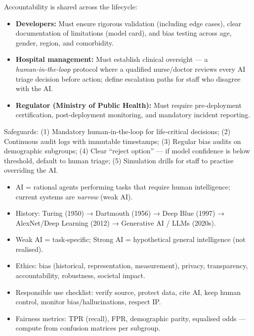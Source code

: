 \documentclass[11pt]{article}
\begin{document}
\begin{corrige}[Exercise 1]
Accountability is shared across the lifecycle:
\begin{itemize}
\item \textbf{Developers:} Must ensure rigorous validation (including edge cases), clear documentation of limitations (model card), and bias testing across age, gender, region, and comorbidity.
\item \textbf{Hospital management:} Must establish clinical oversight — a \emph{human‑in‑the‑loop} protocol where a qualified nurse/doctor reviews every AI triage decision before action; define escalation paths for staff who disagree with the AI.
\item \textbf{Regulator (Ministry of Public Health):} Must require pre‑deployment certification, post‑deployment monitoring, and mandatory incident reporting.
\end{itemize}
Safeguards: (1) Mandatory human‑in‑the‑loop for life‑critical decisions; (2) Continuous audit logs with immutable timestamps; (3) Regular bias audits on demographic subgroups; (4) Clear “reject option” — if model confidence is below threshold, default to human triage; (5) Simulation drills for staff to practise overriding the AI.
\end{corrige}

\begin{aretenir}
\begin{itemize}
\item AI = rational agents performing tasks that require human intelligence; current systems are \emph{narrow} (weak AI).
\item History: Turing (1950) → Dartmouth (1956) → Deep Blue (1997) → AlexNet/Deep Learning (2012) → Generative AI / LLMs (2020s).
\item Weak AI = task‑specific; Strong AI = hypothetical general intelligence (not realised).
\item Ethics: bias (historical, representation, measurement), privacy, transparency, accountability, robustness, societal impact.
\item Responsible use checklist: verify source, protect data, cite AI, keep human control, monitor bias/hallucinations, respect IP.
\item Fairness metrics: TPR (recall), FPR, demographic parity, equalised odds — compute from confusion matrices per subgroup.
\end{itemize}
\end{aretenir}
\end{document}
